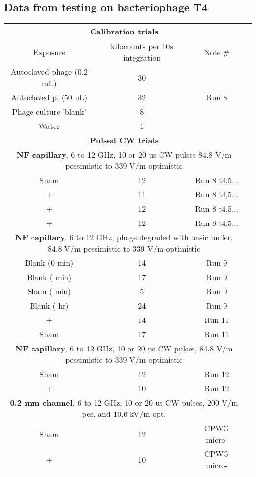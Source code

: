 \documentclass[paper.tex]{subfiles}
\begin{document}
\subsection{Data from testing on bacteriophage T4}
\begin{table}[h!]
	\centering
	\begin{tabular}{ |c|c|c|c| } 
				\hline
		\multicolumn{3}{|c|}{\textbf{Calibration trials} } \\
		\hline
		\hline
		Exposure & kilocounts per 10s integration & Note \# \\
		\hline
		Autoclaved phage (0.2 mL) & 30 & \\ 
		Autoclaved p. (50 uL) & 32 & Run 8\\ 
		\hline
		Phage culture 'blank' & 8 & \\ 
		Water & 1 & \\

		\hline
\multicolumn{3}{|c|}{\textbf{Pulsed CW trials}} \\
\hline


		\hline
		\multicolumn{3}{|c|}{\textbf{NF capillary}, 6 to 12 GHz, 10 or 20 us CW pulses 84.8 V/m pessimistic to 339 V/m optimistic} \\
		\hline
		Sham   & 12 & Run 8 t4,5...\\
		+ & 11 & Run 8 t4,5...\\
		+  & 12 & Run 8 t4,5...\\
		+  & 12 & Run 8 t4,5...\\
		\hline
		\multicolumn{3}{|c|}{\textbf{NF capillary}, 6 to 12 GHz, phage degraded with basic buffer, 84.8 V/m pessimistic to 339 V/m optimistic} \\
		\hline
		Blank (0 min) & 14 & Run 9 \\
		Blank (\ntilde 15 min) & 17 & Run 9\\
		Sham (\ntilde 15 min) & 5 & Run 9\\
		Blank (\ntilde 4 hr) & 24 & Run 9\\
		\hline
		+  & 14 & Run 11\\
		Sham & 17 & Run 11\\
		\hline
		\multicolumn{3}{|c|}{\textbf{NF capillary}, 6 to 12 GHz, 10 or 20 us CW pulses, 84.8 V/m pessimistic to 339 V/m optimistic} \\
		\hline
		Sham & 12 & Run 12\\
		+    & 10 & Run 12\\
		\hline
		\multicolumn{3}{|c|}{\textbf{0.2 mm channel}, 6 to 12 GHz, 10 or 20 us CW pulses, 200 V/m pes. and 10.6 kV/m opt.} \\
		\hline
		 Sham & 12 & CPWG micro-\\
 		 +    & 10 & CPWG micro-\\


\end{tabular}
\end{table}
\end{document}
